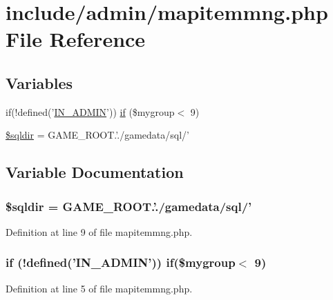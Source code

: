 \hypertarget{mapitemmng_8php}{\section{include/admin/mapitemmng.php File Reference}
\label{mapitemmng_8php}
}
\subsection*{Variables}
\begin{DoxyCompactItemize}
\item 
if(!defined('\hyperlink{admin_8php_ad49472b0cdee543164375bf133a537f1}{I\+N\+\_\+\+A\+D\+M\+I\+N}')) \hyperlink{mapitemmng_8php_abd6a7e7d5b50fb7edca90046f3b4e982}{if} (\$mygroup$<$ 9)
\item 
\hyperlink{mapitemmng_8php_acd9b240ad6d861ecdf6b6bd48b4b0923}{\$sqldir} = G\+A\+M\+E\+\_\+\+R\+O\+O\+T.'./gamedata/sql/'
\end{DoxyCompactItemize}


\subsection{Variable Documentation}
\hypertarget{mapitemmng_8php_acd9b240ad6d861ecdf6b6bd48b4b0923}{
\subsubsection[{\$sqldir}]{\setlength{\rightskip}{0pt plus 5cm}\$sqldir = G\+A\+M\+E\+\_\+\+R\+O\+O\+T.'./gamedata/sql/'}}\label{mapitemmng_8php_acd9b240ad6d861ecdf6b6bd48b4b0923}


Definition at line 9 of file mapitemmng.\+php.

\hypertarget{mapitemmng_8php_abd6a7e7d5b50fb7edca90046f3b4e982}{
\subsubsection[{if}]{\setlength{\rightskip}{0pt plus 5cm}if (!defined('{\bf I\+N\+\_\+\+A\+D\+M\+I\+N}')) if(\$mygroup$<$ 9)}}\label{mapitemmng_8php_abd6a7e7d5b50fb7edca90046f3b4e982}


Definition at line 5 of file mapitemmng.\+php.

